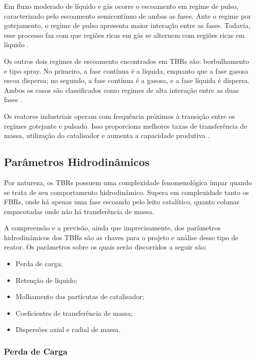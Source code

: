 Em fluxo moderado de líquido e gás ocorre o escoamento em regime de pulso,
caracterizado pelo escoamento semicontínuo de ambas as fases. Ante o regime
por gotejamento, o regime de pulso apresenta maior interação entre as fases.
Todavia, esse processo faz com que regiões ricas em gás se alternem com regiões
ricas em líquido \cite{Saroha1996}.

Os outros dois regimes de escoamento encontrados em TBRs são: borbulhamento e
tipo spray. No primeiro, a fase contínua é a líquida, enquanto que a fase gasosa
escoa dispersa; no segundo, a fase contínua é a gasosa, e a fase líquida é
dispersa. Ambos os casos são classificados como regimes de alta interação entre
as duas fases \cite{Saroha1996}.

Os reatores industriais operam com frequência próximos à transição entre os
regimes gotejante e pulsado. Isso proporciona melhores taxas de transferência de
massa, utilização do catalisador e aumenta a capacidade produtiva
\cite{Ancheyta2011}.

\subsection{Parâmetros Hidrodinâmicos}
\label{sec:parametroshidrodinamicos}

Por natureza, os TBRs possuem uma complexidade fenomenológica ímpar quando se
trata de seu comportamento hidrodinâmico. Supera em complexidade tanto os FBRs,
onde há apenas uma fase escoando pelo leito catalítico, quanto colunas
empacotadas onde não há transferência de massa. 

A compreensão e a previsão, ainda que imprecisamente, dos parâmetros
hidrodinâmicos dos TBRs são as chaves para o projeto e análise desse tipo de
reator. Os parâmetros sobre os quais serão discorridos a seguir são:

\begin{itemize}
  \item Perda de carga;
  \item Retenção de líquido;
  \item Molhamento das partícutas de catalisador;
  \item Coeficientes de transferência de massa;
  \item Dispersões axial e radial de massa.
\end{itemize}

\subsubsection{Perda de Carga}
\label{sec:perdadecarga}

